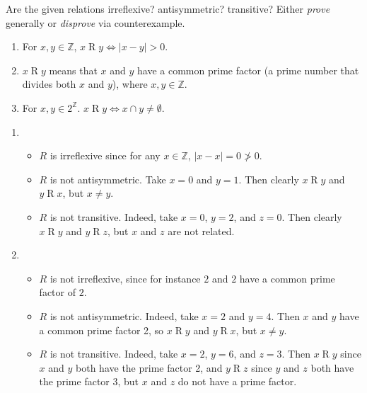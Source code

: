 \documentclass{article}
\newcommand{\Z}{\mathbb{Z}}
\theoremstyle{definition}
\begin{document}
\begin{question}
    Are the given relations irreflexive? antisymmetric? transitive? Either \textit{prove} generally or \textit{disprove} via 
    counterexample.
    	\begin{enumerate}
	\item For $x, y \in \Z$,  $x\mathrel{R}y \iff |x - y| > 0$. 
	\item  $x\mathrel{R}y$ means that $x$ and $y$ have a common prime factor (a prime number that divides both $x$ and $y$), 
	where $x, y \in \Z$.
	\item For $x, y \in 2^{\Z}$. $x\mathrel{R}y \iff x \cap y \neq \emptyset$.
	\end{enumerate}
\end{question}
\begin{solution}
\begin{enumerate}
	\item
\begin{itemize}
		\item $ R$ is irreflexive since for any $x \in \Z$, $|x-x|  = 0 \not > 0$.
		\item $ R$ is not antisymmetric. Take $x = 0$ and $y = 1$. Then clearly $x \mathrel{R}y$ and $y \mathrel{R}x$, but $x \neq y$.
		\item $ R$ is not transitive. Indeed, take $x = 0$, $y = 2$, and $z = 0$. Then clearly $x \mathrel{R}y$ and $y \mathrel{R}z$, but $x$ and $z$ are not related.
	\end{itemize}
	
	\item 
	\begin{itemize}
		\item $ R$ is not irreflexive, since for instance $2$ and $2$ have a common prime factor of $2$.
		\item $ R$ is not antisymmetric. Indeed, take $x = 2$ and $y = 4$. Then $x$ and $y$ have a common prime factor 2, so $x \mathrel{R}y$ and $y \mathrel{R}x$, but $x \neq y$.
		\item $ R$ is not transitive. Indeed, take $x = 2$, $y = 6$, and $z = 3$. Then $x \mathrel{R}y$ since $x$ and $y$ both have the prime factor 2, and $y \mathrel{R}z$ since $y$ and $z$ both have the prime factor 3, but $x$ and $z$ do not have a prime factor.
	\end{itemize}
	

\end{enumerate}
\end{solution}
\end{document}
